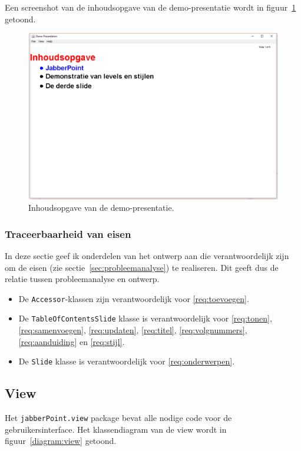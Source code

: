\documentclass[a4paper]{article}
\newcommand{\reqref}[1]{\ref{req:#1}}
\newcommand{\code}[1]{\lstinline[columns=fixed]{#1}}
\begin{document}
			Een screenshot van de inhoudsopgave van de demo-presentatie wordt in figuur~\ref{fig:master} getoond.
			\begin{figure}[!htb]
			 \caption{
				Inhoudsopgave van de demo-presentatie.\label{fig:master}
			 }
			 \centering \includegraphics[width=\textwidth]{Screenshots/master.png}
			\end{figure}

		\subsubsection{Traceerbaarheid van eisen}
			In deze sectie geef ik onderdelen van het ontwerp aan die verantwoordelijk zijn om de eisen (zie sectie~\ref{sec:probleemanalyse}) te realiseren.
			Dit geeft dus de relatie tussen probleemanalyse en ontwerp.

			\begin{itemize}
				\item De \code{Accessor}-klassen zijn verantwoordelijk voor \reqref{toevoegen}.
				\item De \code{TableOfContentsSlide} klasse is verantwoordelijk voor \reqref{tonen}, \reqref{samenvoegen},
					\reqref{updaten}, \reqref{titel}, \reqref{volgnummers}, \reqref{aanduiding} en \reqref{stijl}.
				\item De \code{Slide} klasse is verantwoordelijk voor \reqref{onderwerpen}.
			\end{itemize}

	\subsection{View}\label{sec:view}
		Het \code{jabberPoint.view} package bevat alle nodige code voor de gebruikersinterface.
		Het klassendiagram van de view wordt in figuur~\ref{diagram:view} getoond.
\end{document}
